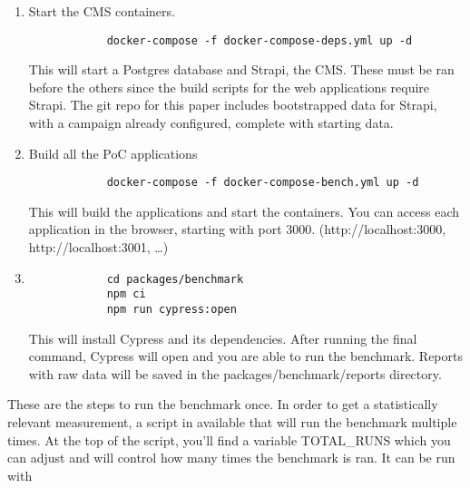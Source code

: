 \begin{enumerate}
	\item Start the CMS containers.
	      \begin{verbatim}
			docker-compose -f docker-compose-deps.yml up -d
	      \end{verbatim}
	      This will start a Postgres database and Strapi, the CMS. 
	      These must be ran before the others since the build scripts for the web applications require Strapi.
	      The git repo for this paper includes bootstrapped data for Strapi, with a campaign already configured, complete with starting data.
	\item Build all the PoC applications
	      	      	      	      	      	      	      	      	      	      	      	      	      	      	      	      	      	      	      	      	      	      	      	      	      	      	      	      	      	
	      \begin{verbatim}
			docker-compose -f docker-compose-bench.yml up -d
	      \end{verbatim}
	      This will build the applications and start the containers. 
	      You can access each application in the browser, starting with port 3000. (http://localhost:3000, http://localhost:3001, \dots)
	      	      	      	      	      	      	      	      	      	      	      	      	      	      	      	      	      	      	      	      	      	      	      	      	      	      	      	      	      
	\item  
	      	      	      	      	      	      	      	      	      	      	      	      	      	      	      	      	      	      	      	      	      	      	      	      	      	      	      
	      \begin{verbatim}
			cd packages/benchmark
			npm ci
			npm run cypress:open
	      \end{verbatim}
	      	      	      	      	      	      	      	      	      	      	      	      	      	      	      	      	      	      	      	      	      	      	      	      	      	      	      
	      This will install Cypress and its dependencies. 
	      After running the final command, Cypress will open and you are able to run the benchmark.
	      Reports with raw data will be saved in the packages/benchmark/reports directory.
\end{enumerate}

These are the steps to run the benchmark once. In order to get a statistically relevant measurement, a script in available that will run the benchmark multiple times.
At the top of the script, you'll find a variable TOTAL\_RUNS which you can adjust and will control how many times the benchmark is ran.
It can be run with

